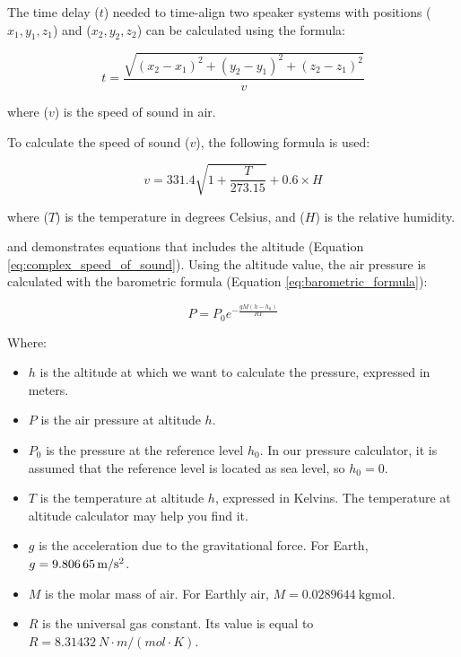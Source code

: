         The time delay ($t$) needed to time-align two speaker systems with positions ($x_1, y_1, z_1$) and ($x_2, y_2, z_2$) can be calculated using the formula:

        \begin{equation}\label{eq:time_delay}
            t = \frac{\sqrt{(x_2 - x_1)^2 + (y_2 - y_1)^2 + (z_2 - z_1)^2}}{v}
        \end{equation}

        where ($v$) is the speed of sound in air.

        To calculate the speed of sound ($v$), the following formula is used:

        \begin{equation}\label{eq:speed_of_sound}
            v = 331.4 \sqrt{1 + \frac{T}{273.15}} + 0.6 \times H
        \end{equation}

        where ($T$) is the temperature in degrees Celsius, and ($H$) is the relative humidity.
        
        \citet{cramer1993} and \citet{picard2008} demonstrates equations that includes the altitude (Equation \ref{eq:complex_speed_of_sound}). Using the altitude value, the air pressure is calculated with the barometric formula (Equation \ref{eq:barometric_formula}):

        \begin{equation}\label{eq:barometric_formula}
            P = P_0 e^{-\frac{gM(h - h_0)}{RT}}
        \end{equation}
            
        Where:
        \begin{itemize}
            \item $h$ is the altitude at which we want to calculate the pressure, expressed in meters.
            \item $P$ is the air pressure at altitude $h$.
            \item $P_0$ is the pressure at the reference level $h_0$. In our pressure calculator, it is assumed that the reference level is located as sea level, so $h_0 = 0$.
            \item $T$ is the temperature at altitude $h$, expressed in Kelvins. The temperature at altitude calculator may help you find it.
            \item $g$ is the acceleration due to the gravitational force. For Earth, $g = \SI{9.80665}{\m/s\squared}$.
            \item $M$ is the molar mass of air. For Earthly air, $M = \SI{0.0289644}{\kg\mol}$.
            \item $R$ is the universal gas constant. Its value is equal to $R = \SI{8.31432}{N \cdot m/(mol \cdot K)}$.
        \end{itemize}

